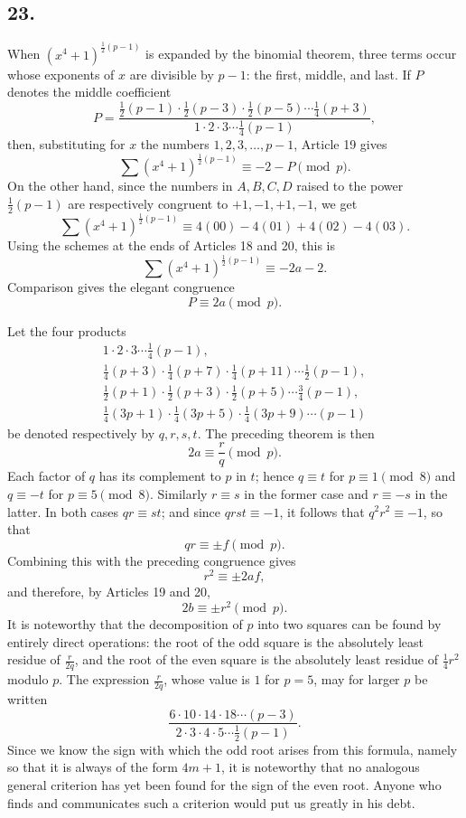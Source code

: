 \documentclass[12pt]{article}
\begin{document}
\subsection*{23.}

When $(x^4+1)^{\frac12(p-1)}$ is expanded by the binomial theorem, three terms occur whose exponents of $x$ are divisible by $p-1$: the first, middle, and last. If $P$ denotes the middle coefficient
\[
P=\frac{\frac12(p-1)\cdot\frac12(p-3)\cdot\frac12(p-5)\cdots\frac14(p+3)}
{1\cdot2\cdot3\cdots\frac14(p-1)},
\]
then, substituting for $x$ the numbers $1,2,3,\ldots,p-1$, Article 19 gives
\[
\sum (x^4+1)^{\frac12(p-1)}\equiv -2-P \pmod p.
\]
On the other hand, since the numbers in $A,B,C,D$ raised to the power $\frac12(p-1)$ are respectively congruent to $+1,-1,+1,-1$, we get
\[
\sum (x^4+1)^{\frac12(p-1)}
 \equiv 4(00)-4(01)+4(02)-4(03).
\]
Using the schemes at the ends of Articles 18 and 20, this is
\[
\sum (x^4+1)^{\frac12(p-1)}\equiv -2a-2.
\]
Comparison gives the elegant congruence
\[
P\equiv 2a\pmod p.
\]

Let the four products
\[
\begin{gathered}
1\cdot2\cdot3\cdots\frac14(p-1),\\
\frac14(p+3)\cdot\frac14(p+7)\cdot\frac14(p+11)\cdots\frac12(p-1),\\
\frac12(p+1)\cdot\frac12(p+3)\cdot\frac12(p+5)\cdots\frac34(p-1),\\
\frac14(3p+1)\cdot\frac14(3p+5)\cdot\frac14(3p+9)\cdots(p-1)
\end{gathered}
\]
be denoted respectively by $q,r,s,t$. The preceding theorem is then
\[
2a\equiv \frac{r}{q}\pmod p.
\]
Each factor of $q$ has its complement to $p$ in $t$; hence $q\equiv t$ for $p\equiv1\pmod8$ and $q\equiv-t$ for $p\equiv5\pmod8$. Similarly $r\equiv s$ in the former case and $r\equiv -s$ in the latter. In both cases $qr\equiv st$; and since $qrst\equiv-1$, it follows that $q^2r^2\equiv-1$, so that
\[
qr\equiv\pm f\pmod p.
\]
Combining this with the preceding congruence gives
\[
r^2\equiv\pm 2af,
\]
and therefore, by Articles 19 and 20,
\[
2b\equiv\pm r^2\pmod p.
\]
It is noteworthy that the decomposition of $p$ into two squares can be found by entirely direct operations: the root of the odd square is the absolutely least residue of $\frac{r}{2q}$, and the root of the even square is the absolutely least residue of $\frac14r^2$ modulo $p$. The expression $\frac{r}{2q}$, whose value is $1$ for $p=5$, may for larger $p$ be written
\[
\frac{6\cdot10\cdot14\cdot18\cdots(p-3)}
{2\cdot3\cdot4\cdot5\cdots\frac12(p-1)}.
\]
Since we know the sign with which the odd root arises from this formula, namely so that it is always of the form $4m+1$, it is noteworthy that no analogous general criterion has yet been found for the sign of the even root. Anyone who finds and communicates such a criterion would put us greatly in his debt.
\end{document}
